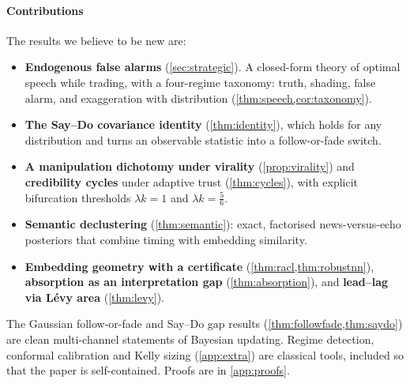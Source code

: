 \documentclass[10pt,twocolumn,letterpaper]{article}
\theoremstyle{plain}
\theoremstyle{definition}
\theoremstyle{remark}
\begin{document}
\paragraph{Contributions} The results we believe to be new are:
\begin{itemize}
  \item \textbf{Endogenous false alarms} (\cref{sec:strategic}). A closed-form theory of optimal speech while trading, with a four-regime taxonomy: truth, shading, false alarm, and exaggeration with distribution (\cref{thm:speech,cor:taxonomy}).
  \item \textbf{The Say--Do covariance identity} (\cref{thm:identity}), which holds for any distribution and turns an observable statistic into a follow-or-fade switch.
  \item \textbf{A manipulation dichotomy under virality} (\cref{prop:virality}) and \textbf{credibility cycles} under adaptive trust (\cref{thm:cycles}), with explicit bifurcation thresholds $\lambda k=1$ and $\lambda k=\tfrac56$.
  \item \textbf{Semantic declustering} (\cref{thm:semantic}): exact, factorised news-versus-echo posteriors that combine timing with embedding similarity.
  \item \textbf{Embedding geometry with a certificate} (\cref{thm:racl,thm:robustnn}), \textbf{absorption as an interpretation gap} (\cref{thm:absorption}), and \textbf{lead--lag via L\'evy area} (\cref{thm:levy}).
\end{itemize}
The Gaussian follow-or-fade and Say--Do gap results (\cref{thm:followfade,thm:saydo}) are clean multi-channel statements of Bayesian updating. Regime detection, conformal calibration and Kelly sizing (\cref{app:extra}) are classical tools, included so that the paper is self-contained. Proofs are in \cref{app:proofs}.
\end{document}
